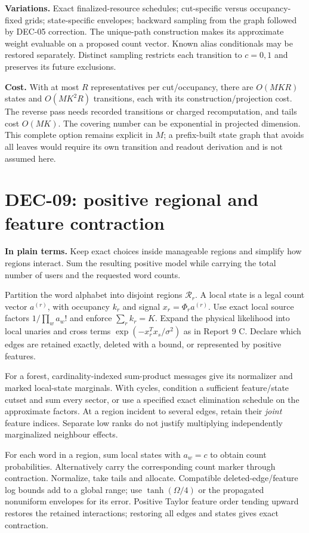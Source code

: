 \documentclass[10pt,a4paper]{article}
\begin{document}
\textbf{Variations.} Exact finalized-resource schedules; cut-specific versus occupancy-fixed grids;
state-specific envelopes; backward sampling from the graph followed by DEC-05 correction.
The unique-path construction makes its approximate weight evaluable on a proposed count vector.
Known alias conditionals may be restored separately.
Distinct sampling restricts each transition to $c=0,1$ and preserves its future exclusions.

\textbf{Cost.} With at most $R$ representatives per cut/occupancy, there are $O(MKR)$ states and
$O(MK^2R)$ transitions, each with its construction/projection cost.
The reverse pass needs recorded transitions or charged recomputation, and tails cost $O(MK)$.
The covering number can be exponential in projected dimension.
This complete option remains explicit in $M$; a prefix-built state graph that avoids all leaves would
require its own transition and readout derivation and is not assumed here.

\clearpage
\section{DEC-09: positive regional and feature contraction}
\label{sec:positive-contraction}
\textbf{In plain terms.} Keep exact choices inside manageable regions and simplify how regions interact.
Sum the resulting positive model while carrying the total number of users and the requested word counts.

Partition the word alphabet into disjoint regions $\mathcal R_r$.
A local state is a legal count vector $a^{(r)}$, with occupancy $k_r$ and signal $x_r=\Phi_r a^{(r)}$.
Use exact local source factors $1/\prod_w a_w!$ and enforce $\sum_rk_r=K$.
Expand the physical likelihood into local unaries and cross terms
$\exp(-x_r^Tx_s/\sigma^2)$ as in Report 9 C.
Declare which edges are retained exactly, deleted with a bound, or represented by positive features.

For a forest, cardinality-indexed sum-product messages give its normalizer and marked local-state
marginals. With cycles, condition a sufficient feature/state cutset and sum every sector, or use a
specified exact elimination schedule on the approximate factors.
At a region incident to several edges, retain their \emph{joint} feature indices.
Separate low ranks do not justify multiplying independently marginalized neighbour effects.

For each word in a region, sum local states with $a_w=c$ to obtain count probabilities.
Alternatively carry the corresponding count marker through contraction.
Normalize, take tails and allocate. Compatible deleted-edge/feature log bounds add to a global range;
use $\tanh(\Omega/4)$ or the propagated nonuniform envelopes for its error.
Positive Taylor feature order tending upward restores the retained interactions; restoring all edges
and states gives exact contraction.
\end{document}
